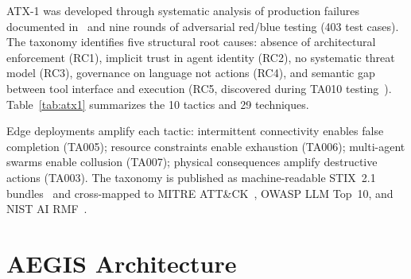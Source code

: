 \documentclass[journal]{IEEEtran}
\begin{document}
ATX-1 was developed through systematic analysis of production failures documented in~\cite{shapira2026} and nine rounds of adversarial red/blue testing (403 test cases). The taxonomy identifies five structural root causes: absence of architectural enforcement (RC1), implicit trust in agent identity (RC2), no systematic threat model (RC3), governance on language not actions (RC4), and semantic gap between tool interface and execution (RC5, discovered during TA010 testing~\cite{tannenbaum2026_computer}). Table~\ref{tab:atx1} summarizes the 10 tactics and 29 techniques.

Edge deployments amplify each tactic: intermittent connectivity enables false completion (TA005); resource constraints enable exhaustion (TA006); multi-agent swarms enable collusion (TA007); physical consequences amplify destructive actions (TA003). The taxonomy is published as machine-readable STIX~2.1 bundles~\cite{atx1_dataset} and cross-mapped to MITRE ATT\&CK~\cite{atx1_navigator}, OWASP LLM Top~10, and NIST AI RMF~\cite{nist_airmf}.

\section{AEGIS Architecture}
\end{document}
